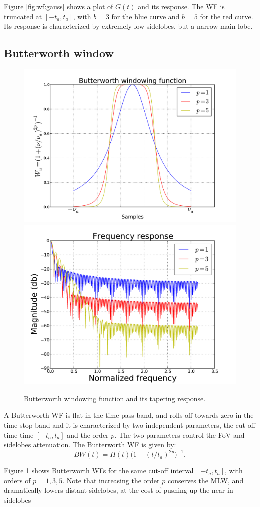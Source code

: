 \documentclass[useAMS,usenatbib]{mn2e}
\begin{document}
Figure \ref{fig:wf:gauss} shows a plot of $G(t)$ and its response. The WF is truncated at $[-t_a,t_a]$, with $b = 3$ for the blue curve and $b=5$ for the red curve. Its response is characterized by extremely low sidelobes, but a narrow main lobe.

\subsection{Butterworth window}
\begin{figure}
\includegraphics[width=.5\textwidth]{./Figures/butterworth.pdf}%
\includegraphics[width=.5\textwidth]{./Figures/freq_resp_butterworth.pdf}
\caption{Butterworth windowing function and its tapering response.}\label{fig:wf:bw}
\end{figure}

A Butterworth WF is flat in the time pass band, and rolls off towards zero in the time stop band and it is 
characterized by two independent parameters, the cut-off time time $[-t_a,t_a]$ and the order $p$. The two parameters control the 
FoV and sidelobes attenuation. The Butterworth WF is given by:
\begin{equation}
BW(t)= \Pi(t) \Big(1 + (t/t_a)^{2p}\Big)^{-1}.
\end{equation}

Figure \ref{fig:wf:bw} shows Butterworth WFs for the same cut-off interval $[-t_a,t_a]$, with orders of $p=1,3,5$. Note that increasing 
the order $p$ conserves the MLW, and dramatically lowers distant sidelobes, at the cost of pushing up the near-in sidelobes
\end{document}
